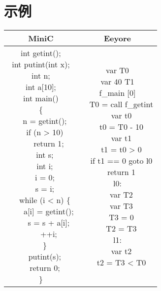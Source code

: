 \documentclass{ctexart}
\newenvironment{typewriterfont}{\ttfamily}{\par}
\begin{document}
\section{示例}
\begin{table}[H]
    \centering
    \begin{typewriterfont}
    \begin{tabular}{|c|c|}
        \hline
        MiniC & Eeyore \\
        \hline
        \makecell[l]{
int getint();\\
int putint(int x);\\
int n;\\
int a[10];\\
int main()\\
\{\\
\ \ n = getint();\\
\ \ if (n > 10)\\
\ \ \ \ return 1;\\
\ \ int s;\\
\ \ int i;\\
\ \ i = 0;\\
\ \ s = i;\\
\ \ while (i < n) \{\\
\ \ \ \ a[i] = getint();\\
\ \ \ \ s = s + a[i];\\
\ \ \ \ ++i;\\
\ \ \}\\
\ \ putint(s);\\
\ \ return 0;\\
\}
        } & \makecell[l]{
var T0\\
var 40 T1\\
f\_main [0]\\
\ \ T0 = call f\_getint\\
\ \ var t0\\
\ \ t0 = T0 - 10\\
\ \ var t1\\
\ \ t1 = t0 > 0\\
\ \ if t1 == 0 goto l0\\
\ \ return 1\\
l0:\\
\ \ var T2\\
\ \ var T3\\
\ \ T3 = 0\\
\ \ T2 = T3\\
l1:\\
\ \ var t2\\
\ \ t2 = T3 < T0\\
}
\end{tabular}
\end{typewriterfont}
\end{table}
\end{document}

